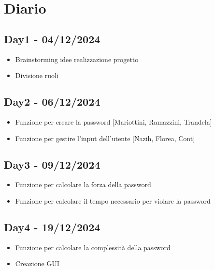 \documentclass{scrartcl}
\begin{document}
    \section{Diario}

        \subsection{Day1 - 04/12/2024}
            \begin{itemize}
                \item Brainstorming idee realizzazione progetto
                \item Divisione ruoli
            \end{itemize}
        
        \subsection{Day2 - 06/12/2024}
            \begin{itemize}
                \item Funzione per creare la password [Mariottini, Ramazzini, Trandela]
                \item Funzione per gestire l'input dell'utente [Nazih, Florea, Cont]
            \end{itemize}
            
        \subsection{Day3 - 09/12/2024}
            \begin{itemize}
                \item Funzione per calcolare la forza della password
                \item Funzione per calcolare il tempo necessario per violare la password
            \end{itemize}

        \subsection{Day4 - 19/12/2024}
        \begin{itemize}
            \item Funzione per calcolare la complessità della password
            \item Creazione GUI
        \end{itemize}
\end{document}
